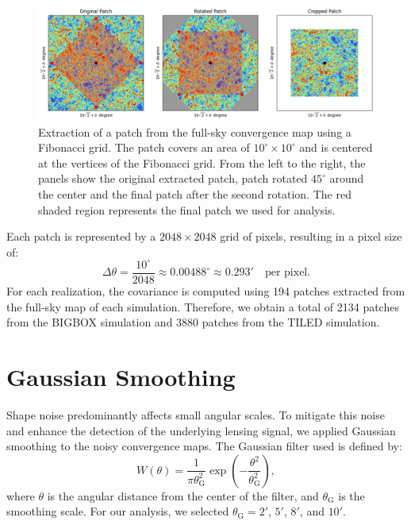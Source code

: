 \begin{figure}
    \centering
    \includegraphics[width=\textwidth]{figures/fibonacci_extraction.png}
    \caption{Extraction of a patch from the full-sky convergence map using a Fibonacci grid. The patch covers an area of $10^\circ \times 10^\circ$ and is centered at the vertices of the Fibonacci grid. From the left to the right, the panels show the original extracted patch, patch rotated $45^\circ$ around the center and the final patch after the second rotation. The red shaded region represents the final patch we used for analysis.
    } \label{fig:fibonacci_extraction}
\end{figure}

Each patch is represented by a $2048 \times 2048$ grid of pixels, resulting in a pixel size of:
\begin{equation}
    \Delta \theta = \frac{10^\circ}{2048} \approx 0.00488^\circ \approx 0.293' \quad \text{per pixel}.
\end{equation}
For each realization, the covariance is computed using 194 patches extracted from the full-sky map of each simulation.
Therefore, we obtain a total of 2134 patches from the BIGBOX simulation and 3880 patches from the TILED simulation. 

\section{Gaussian Smoothing}
Shape noise predominantly affects small angular scales. To mitigate this noise and enhance the detection of the underlying lensing signal, we applied Gaussian smoothing to the noisy convergence maps. The Gaussian filter used is defined by:
\begin{equation}
    W(\theta) = \frac{1}{\pi \theta_{\mathrm{G}}^2} \exp\left( -\frac{\theta^2}{\theta_{\mathrm{G}}^2} \right),
\end{equation}
where $\theta$ is the angular distance from the center of the filter, and $\theta_{\mathrm{G}}$ is the smoothing scale. For our analysis, we selected $\theta_{\mathrm{G}} = 2'$, $5'$, $8'$, and $10'$.

